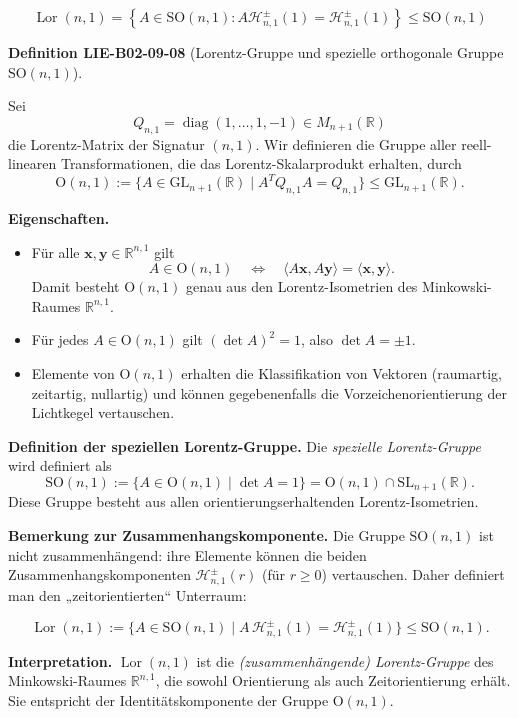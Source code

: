 \documentclass[10pt, letterpaper]{article}
\newcommand{\CustomHeading}[3]{%
  \par\medskip\noindent%
  \textbf{#1 #2} \textnormal{(#3)}.\enskip%
}
\newenvironment{DEF}[2]{\begin{unitbox}\CustomHeading{Definition}{#1}{#2}}{\end{unitbox}}
\begin{document}
$$
\operatorname{Lor}(n, 1)=\left\{A \in \mathrm{SO}(n, 1): A \mathcal{H}_{n, 1}^{ \pm}(1)=\mathcal{H}_{n, 1}^{ \pm}(1)\right\} \leqslant \mathrm{SO}(n, 1)
$$



\begin{DEF}{LIE-B02-09-08}{Lorentz-Gruppe und spezielle orthogonale Gruppe \(\mathrm{SO}(n,1)\)}
Sei
\[
Q_{n,1}=\operatorname{diag}(1,\dots,1,-1)\in M_{n+1}(\mathbb{R})
\]
die Lorentz-Matrix der Signatur \((n,1)\). Wir definieren die Gruppe aller
reell-linearen Transformationen, die das Lorentz-Skalarprodukt erhalten, durch
\[
\mathrm{O}(n,1)
:=\{A\in \mathrm{GL}_{n+1}(\mathbb{R}) \mid A^{T}Q_{n,1}A = Q_{n,1}\}
\leqslant \mathrm{GL}_{n+1}(\mathbb{R}).
\]

\textbf{Eigenschaften.}
\begin{itemize}
  \item Für alle \(\mathbf{x},\mathbf{y}\in\mathbb{R}^{n,1}\) gilt
  \[
  A\in\mathrm{O}(n,1)\quad\Longleftrightarrow\quad
  \langle A\mathbf{x},A\mathbf{y}\rangle = \langle \mathbf{x},\mathbf{y}\rangle.
  \]
  Damit besteht \(\mathrm{O}(n,1)\) genau aus den Lorentz-Isometrien
  des Minkowski-Raumes \(\mathbb{R}^{n,1}\).
  \item Für jedes \(A\in\mathrm{O}(n,1)\) gilt \((\det A)^2=1\), also
  \(\det A=\pm 1\).
  \item Elemente von \(\mathrm{O}(n,1)\) erhalten die Klassifikation von
  Vektoren (raumartig, zeitartig, nullartig) und können gegebenenfalls
  die Vorzeichenorientierung der Lichtkegel vertauschen.
\end{itemize}

\textbf{Definition der speziellen Lorentz-Gruppe.}
Die \emph{spezielle Lorentz-Gruppe} wird definiert als
\[
\mathrm{SO}(n,1)
:=\{A\in \mathrm{O}(n,1)\mid \det A=1\}
=\mathrm{O}(n,1)\cap \mathrm{SL}_{n+1}(\mathbb{R}).
\]
Diese Gruppe besteht aus allen orientierungserhaltenden Lorentz-Isometrien.

\textbf{Bemerkung zur Zusammenhangskomponente.}
Die Gruppe \(\mathrm{SO}(n,1)\) ist nicht zusammenhängend:
ihre Elemente können die beiden Zusammenhangskomponenten
\(\mathcal{H}_{n,1}^{\pm}(r)\) (für \(r\ge 0\))
vertauschen. Daher definiert man den „zeitorientierten“ Unterraum:

\[
\operatorname{Lor}(n,1)
:=\{A\in \mathrm{SO}(n,1)\mid
A\,\mathcal{H}_{n,1}^{\pm}(1)
=\mathcal{H}_{n,1}^{\pm}(1)\}
\leqslant \mathrm{SO}(n,1).
\]

\textbf{Interpretation.}
\(\operatorname{Lor}(n,1)\) ist die \emph{(zusammenhängende) Lorentz-Gruppe}
des Minkowski-Raumes \(\mathbb{R}^{n,1}\), die sowohl Orientierung als auch
Zeitorientierung erhält. Sie entspricht der Identitätskomponente der
Gruppe \(\mathrm{O}(n,1)\).
\end{DEF}
\end{document}
